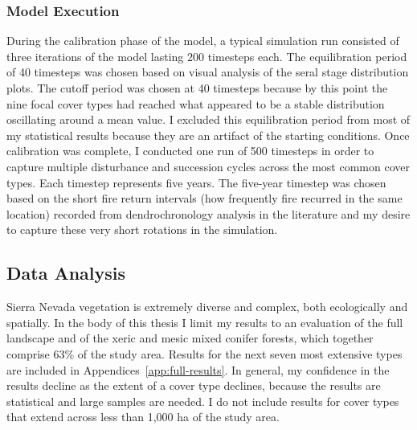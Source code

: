 


\subsubsection*{Model Execution}
During the calibration phase of the model, a typical simulation run consisted of three iterations of the model lasting 200 timesteps each. The equilibration period of 40 timesteps was chosen based on visual analysis of the seral stage distribution plots. The cutoff period was chosen at 40 timesteps because by this point the nine focal cover types had reached what appeared to be a stable distribution oscillating around a mean value. I excluded this equilibration period from most of my statistical results because they are an artifact of the starting conditions. Once calibration was complete, I conducted one run of 500 timesteps in order to capture multiple disturbance and succession cycles across the most common cover types. Each timestep represents five years. The five-year timestep was chosen based on the short fire return intervals (how frequently fire recurred in the same location) recorded from dendrochronology analysis in the literature and my desire to capture these very short rotations in the simulation.

\subsection{Data Analysis}
\label{subsec:dataanalysis}

Sierra Nevada vegetation is extremely diverse and complex, both ecologically and spatially. In the body of this thesis I limit my results to an evaluation of the full landscape and of the xeric and mesic mixed conifer forests, which together comprise 63\% of the study area. Results for the next seven most extensive types are included in Appendices~\ref{app:full-results}. In general, my confidence in the results decline as the extent of a cover type declines, because the results are statistical and large samples are needed. I do not include results for cover types that extend across less than 1,000 ha of the study area.

